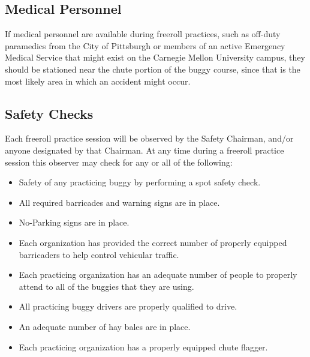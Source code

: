 \subsection{Medical Personnel}

	If medical personnel are available during freeroll practices, such as off-duty paramedics from the City of Pittsburgh or members of an active Emergency Medical Service that might exist on the Carnegie Mellon University campus, they should be stationed near the chute portion of the buggy course, since that is the most likely area in which an accident might occur.

\subsection{Safety Checks}

	Each freeroll practice session will be observed by the Safety Chairman, and/or anyone designated by that Chairman. At any time during a freeroll practice session this observer may check for any or all of the following:

	\begin{itemize}

		\item Safety of any practicing buggy by performing a spot safety check.

		\item All required barricades and warning signs are in place.

		\item No-Parking signs are in place.

		\item Each organization has provided the correct number of properly equipped barricaders to help control vehicular traffic.

		\item Each practicing organization has an adequate number of people to properly attend to all of the buggies that they are using.

		\item All practicing buggy drivers are properly qualified to drive.

		\item An adequate number of hay bales are in place.

		\item Each practicing organization has a properly equipped chute flagger.

	\end{itemize}

